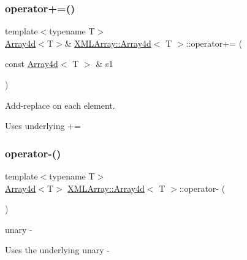 \subsubsection{\texorpdfstring{operator+=()}{operator+=()}\hspace{0.1cm}{\footnotesize\ttfamily [2/2]}}
{\footnotesize\ttfamily template$<$typename T$>$ \\
\mbox{\hyperlink{classXMLArray_1_1Array4d}{Array4d}}$<$T$>$\& \mbox{\hyperlink{classXMLArray_1_1Array4d}{X\+M\+L\+Array\+::\+Array4d}}$<$ T $>$\+::operator+= (\begin{DoxyParamCaption}\item[{const \mbox{\hyperlink{classXMLArray_1_1Array4d}{Array4d}}$<$ T $>$ \&}]{s1 }\end{DoxyParamCaption})\hspace{0.3cm}{\ttfamily [inline]}}



Add-\/replace on each element. 

Uses underlying += \mbox{\label{classXMLArray_1_1Array4d_a33d29c88630265c416d8e8a7355f166e}} 
\subsubsection{\texorpdfstring{operator-\/()}{operator-()}\hspace{0.1cm}{\footnotesize\ttfamily [1/2]}}
{\footnotesize\ttfamily template$<$typename T$>$ \\
\mbox{\hyperlink{classXMLArray_1_1Array4d}{Array4d}}$<$T$>$ \mbox{\hyperlink{classXMLArray_1_1Array4d}{X\+M\+L\+Array\+::\+Array4d}}$<$ T $>$\+::operator-\/ (\begin{DoxyParamCaption}{ }\end{DoxyParamCaption})\hspace{0.3cm}{\ttfamily [inline]}}



unary -\/ 

Uses the underlying unary -\/ \mbox{\label{classXMLArray_1_1Array4d_a33d29c88630265c416d8e8a7355f166e}} 
